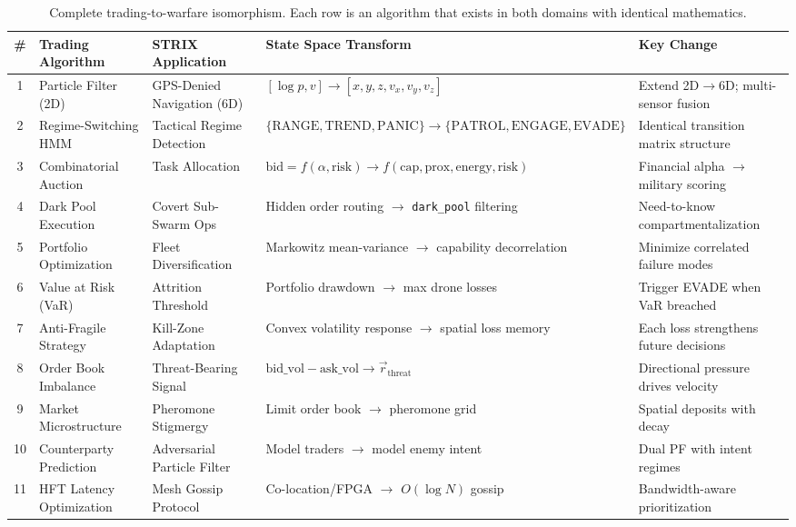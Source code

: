 \documentclass[conference]{IEEEtran}
\begin{document}
\begin{table}[t]
\centering
\caption{Complete trading-to-warfare isomorphism.  Each row is an
algorithm that exists in both domains with identical mathematics.}
\label{tab:isomorphism}
\small
\begin{tabular}{@{}clllp{5.0cm}@{}}
\toprule
\textbf{\#} & \textbf{Trading Algorithm} & \textbf{STRIX Application} & \textbf{State Space Transform} & \textbf{Key Change} \\
\midrule
1  & Particle Filter (2D)       & GPS-Denied Navigation (6D)     & $[\log p, v]\!\to\![x,y,z,v_x,v_y,v_z]$ & Extend 2D$\to$6D; multi-sensor fusion \\
2  & Regime-Switching HMM       & Tactical Regime Detection      & $\{\text{RANGE},\text{TREND},\text{PANIC}\}\!\to\!\{\text{PATROL},\text{ENGAGE},\text{EVADE}\}$ & Identical transition matrix structure \\
3  & Combinatorial Auction      & Task Allocation                & $\text{bid}=f(\alpha,\text{risk})\!\to\!f(\text{cap},\text{prox},\text{energy},\text{risk})$ & Financial alpha $\to$ military scoring \\
4  & Dark Pool Execution        & Covert Sub-Swarm Ops           & Hidden order routing $\to$ \texttt{dark\_pool} filtering & Need-to-know compartmentalization \\
5  & Portfolio Optimization     & Fleet Diversification          & Markowitz mean-variance $\to$ capability decorrelation & Minimize correlated failure modes \\
6  & Value at Risk (VaR)        & Attrition Threshold            & Portfolio drawdown $\to$ max drone losses & Trigger EVADE when VaR breached \\
7  & Anti-Fragile Strategy      & Kill-Zone Adaptation           & Convex volatility response $\to$ spatial loss memory & Each loss strengthens future decisions \\
8  & Order Book Imbalance       & Threat-Bearing Signal          & $\text{bid\_vol}-\text{ask\_vol}\!\to\!\vec{r}_{\text{threat}}$ & Directional pressure drives velocity \\
9  & Market Microstructure      & Pheromone Stigmergy            & Limit order book $\to$ pheromone grid & Spatial deposits with decay \\
10 & Counterparty Prediction    & Adversarial Particle Filter    & Model traders $\to$ model enemy intent & Dual PF with intent regimes \\
11 & HFT Latency Optimization   & Mesh Gossip Protocol           & Co-location/FPGA $\to$ $O(\log N)$ gossip & Bandwidth-aware prioritization \\

\end{tabular}
\end{table}
\end{document}
